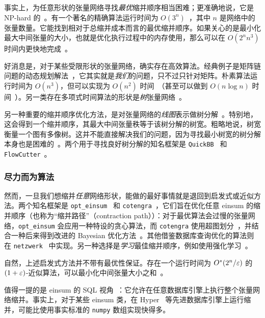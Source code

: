 事实上，为任意形状的张量网络寻找\emph{最优}缩并顺序相当困难；更准确地说，它是 NP-hard 的~\cite{ordering_np_hard}。有一个著名的精确算法运行时间为 $O(3^n)$~\cite{ordering_exact_algo}，其中 $n$ 是网络中的张量数量。它能找到相对于总缩并成本而言的最优缩并顺序。如果关心的是最小化最大中间张量的大小，也就是优化执行过程中的内存使用，那么可以在 $O(2^n n^3)$ 时间内更快地完成~\cite{dpconv}。

好消息是，对于某些受限形状的张量网络，确实存在高效算法。经典例子是矩阵链问题的动态规划解法~\cite{cormen}，它其实就是\emph{我们}的问题，只不过只针对矩阵。朴素算法运行时间为 $O(n^3)$，但可以实现为 $O(n^2)$ 时间~\cite{mc_yao}（甚至可以做到 $O(n \log n)$ 时间~\cite{mc_nlogn_1, mc_nlogn_2}）。另一类存在多项式时间算法的形状是\emph{树}张量网络~\cite{ttn_size, ttn_cost}。

另一种重要的缩并顺序优化方法，是对张量网络的\emph{线图}表示做树分解~\cite{markov_shi, dudek_tree_decomp, roman_tree_decomp}。特别地，这会得到一个缩并顺序，其最大中间张量秩等于该树分解的树宽。粗略地说，树宽衡量一个图有多像树。这并不能直接解决我们的问题，因为寻找最小树宽的树分解本身也是困难的~\cite{treewidth_approx}。两个用于寻找良好树分解的知名框架是 \texttt{QuickBB}~\cite{quick_bb} 和 \texttt{FlowCutter}~\cite{flow_cutter_1, flow_cutter_2}。

\subsubsection{尽力而为算法}

然而，一旦我们想缩并\emph{任意}网络形状，能做的最好事情就是退回到启发式或近似方法。两个知名框架是 \texttt{opt\_einsum}~\cite{opt_einsum} 和 \texttt{cotengra}~\cite{cotengra}，它们旨在优化任意 einsum 的缩并顺序（也称为“缩并路径”（contraction path））：对于最优算法会过慢的张量网络，\texttt{opt\_einsum} 会应用一种特设的贪心算法，而 \texttt{cotengra} 使用超图划分~\cite{kahypar}，并结合一种后来得到改进的 Bayesian 优化方法~\cite{jena_tn_cut}。其他借鉴数据库查询优化的算法则在 \texttt{netzwerk}~\cite{ttn_cost} 中实现。另一种选择是\emph{学习}最佳缩并顺序，例如使用强化学习~\cite{meirom_tn_rl}。

自然，上述启发式方法并不带有最优性保证。存在一个运行时间为 $O^*(2^n / \varepsilon)$ 的 $(1+\varepsilon)$-近似算法，可以最小化中间张量大小之和~\cite{dpconv}。

值得一提的是 einsum 的 SQL 视角~\cite{einsum_as_sql}：它允许在任意数据库引擎上执行整个张量网络缩并。事实上，对于某些 einsum 类，在 Hyper~\cite{hyper} 等先进数据库引擎上运行缩并，可能比使用事实标准的 \texttt{numpy} 数组实现快得多。
